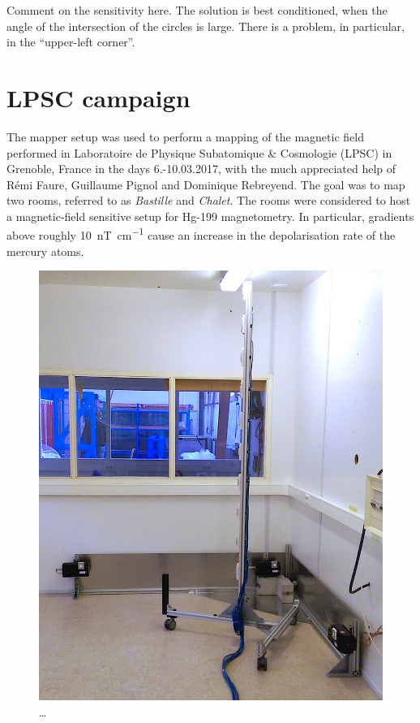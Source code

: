 Comment on the sensitivity here. The solution is best conditioned, when the angle of the intersection of the circles is large. There is a problem, in particular, in the ``upper-left corner''.



\section{LPSC campaign}
The mapper setup was used to perform a mapping of the magnetic field performed in Laboratoire de Physique Subatomique \& Cosmologie (LPSC) in Grenoble, France in the days 6.-10.03.2017, with the much appreciated help of Rémi Faure, Guillaume Pignol and Dominique Rebreyend. The goal was to map two rooms, referred to as \emph{Bastille} and \emph{Chalet}. The rooms were considered to host a magnetic-field sensitive setup for Hg-199 magnetometry. In particular, gradients above roughly \SI[per-mode=symbol]{10}{\nano\tesla\per\centi\meter} cause an increase in the depolarisation rate of the mercury atoms.

\begin{figure}
  \centering
  \includegraphics[width=0.9\linewidth]{gfx/mapping/lpsc/setup_edited.jpg}
  \caption{\ldots}
  \label{fig:mapping_bastille_setup}
\end{figure}

